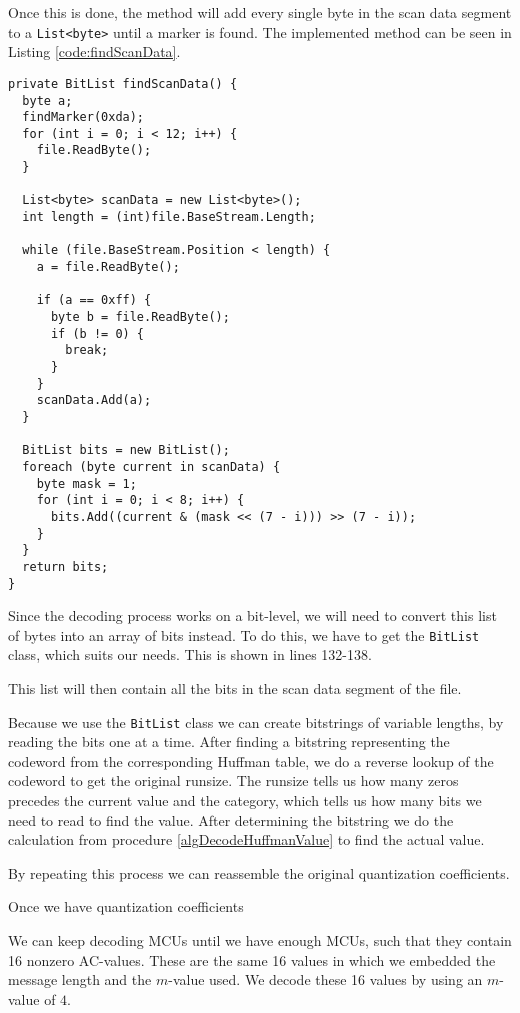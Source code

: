 Once this is done, the method will add every single byte in the scan data segment to a \lstinline|List<byte>| until a marker is found.
The implemented method can be seen in Listing \ref{code:findScanData}.

\begin{lstlisting}[firstnumber=110, label={code:findScanData}, caption={Read in the ScanData section into a \lstinline|BitList| \textbf{File: }JPEGDecoder.cs}]
private BitList findScanData() {
  byte a;
  findMarker(0xda);
  for (int i = 0; i < 12; i++) {
    file.ReadByte();
  }

  List<byte> scanData = new List<byte>();
  int length = (int)file.BaseStream.Length;

  while (file.BaseStream.Position < length) {
    a = file.ReadByte();

    if (a == 0xff) {
      byte b = file.ReadByte();
      if (b != 0) {
        break;
      }
    }
    scanData.Add(a);
  }

  BitList bits = new BitList();
  foreach (byte current in scanData) {
    byte mask = 1;
    for (int i = 0; i < 8; i++) {
      bits.Add((current & (mask << (7 - i))) >> (7 - i));
    }
  }
  return bits;
}
\end{lstlisting}

Since the decoding process works on a bit-level, we will need to convert this list of bytes into an array of bits instead.
To do this, we have to get the \lstinline|BitList| class, which suits our needs.
This is shown in lines 132-138.

This list will then contain all the bits in the scan data segment of the file.

Because we use the \lstinline|BitList| class we can create bitstrings of variable lengths, by reading the bits one at a time.
After finding a bitstring representing the codeword from the corresponding Huffman table, we do a reverse lookup of the codeword to get the original runsize.
The runsize tells us how many zeros precedes the current value and the category, which tells us how many bits we need to read to find the value.
After determining the bitstring we do the calculation from procedure \ref{algDecodeHuffmanValue} to find the actual value.

By repeating this process we can reassemble the original quantization coefficients.

Once we have quantization coefficients 

We can keep decoding MCUs until we have enough MCUs, such that they contain 16 nonzero AC-values.
These are the same 16 values in which we embedded the message length and the $m$-value used.
We decode these 16 values by using an $m$-value of $4$.

